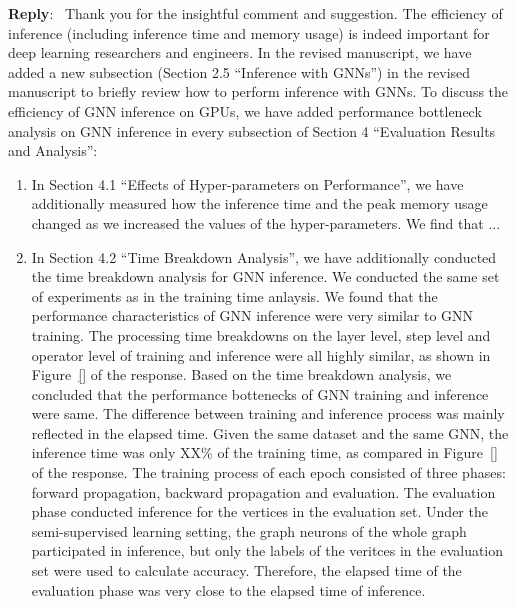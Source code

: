 \documentclass[12pt]{article}
\newenvironment{reply}
   {\medskip \noindent \textbf{Reply}:\  }
   {\medskip}
\begin{document}
\begin{reply}
    Thank you for the insightful comment and suggestion.
    The efficiency of inference (including inference time and memory usage) is indeed important for deep learning researchers and engineers.
    In the revised manuscript, we have added a new subsection (Section 2.5 ``Inference with GNNs'') in the revised manuscript to briefly review how to perform inference with GNNs.
    To discuss the efficiency of GNN inference on GPUs, we have added performance bottleneck analysis on GNN inference in every subsection of Section 4 ``Evaluation Results and Analysis'':
    \begin{enumerate}

        \item In Section 4.1 ``Effects of Hyper-parameters on Performance'', we have additionally measured how the inference time and the peak memory usage changed as we increased the values of the hyper-parameters.
        We find that ...
        
        \item In Section 4.2 ``Time Breakdown Analysis'', we have additionally conducted the time breakdown analysis for GNN inference.
        We conducted the same set of experiments as in the training time anlaysis.
        We found that the performance characteristics of GNN inference were very similar to GNN training.
        The processing time breakdowns on the layer level, step level and operator level of training and inference were all highly similar, as shown in Figure~\ref{} of the response.
        Based on the time breakdown analysis, we concluded that the performance bottenecks of GNN training and inference were same.
        The difference between training and inference process was mainly reflected in the elapsed time.
        Given the same dataset and the same GNN, the inference time was only XX\% of the training time, as compared in Figure~\ref{} of the response.
        The training process of each epoch consisted of three phases: forward propagation, backward propagation and evaluation.
        The evaluation phase conducted inference for the vertices in the evaluation set.
        Under the semi-supervised learning setting, the graph neurons of the whole graph participated in inference, but only the labels of the veritces in the evaluation set were used to calculate accuracy.
        Therefore, the elapsed time of the evaluation phase was very close to the elapsed time of inference.



\end{enumerate}
\end{reply}
\end{document}
